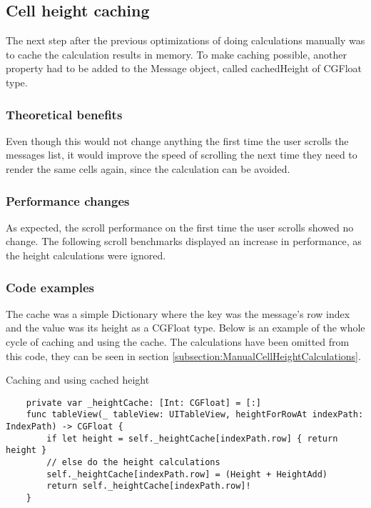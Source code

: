 \documentclass[a4paper,12pt]{article}
\begin{document}
\subsection{Cell height caching}
The next step after the previous optimizations of doing calculations manually was to cache the calculation results in memory. To make caching possible, another property had to be added to the Message object, called cachedHeight of CGFloat type.

\subsubsection*{Theoretical benefits}
Even though this would not change anything the first time the user scrolls the messages list, it would improve the speed of scrolling the next time they need to render the same cells again, since the calculation can be avoided.

\subsubsection*{Performance changes}
As expected, the scroll performance on the first time the user scrolls showed no change. The following scroll benchmarks displayed an increase in performance, as the height calculations were ignored.

\subsubsection*{Code examples}
The cache was a simple Dictionary where the key was the message's row index and the value was its height as a CGFloat type. Below is an example of the whole cycle of caching and using the cache. The calculations have been omitted from this code, they can be seen in section \ref{subsection:ManualCellHeightCalculations}. 
\begin{listing}[H]
  \caption{Caching and using cached height}
  \begin{verbatim}
    private var _heightCache: [Int: CGFloat] = [:]
    func tableView(_ tableView: UITableView, heightForRowAt indexPath: IndexPath) -> CGFloat {
        if let height = self._heightCache[indexPath.row] { return height }
        // else do the height calculations
        self._heightCache[indexPath.row] = (Height + HeightAdd)
        return self._heightCache[indexPath.row]!
    }
  \end{verbatim}
\end{listing}
\end{document}
